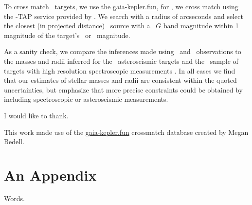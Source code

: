 \documentclass[modern]{aastex63}
\begin{document}
To cross match \kepler\ targets, we use the \href{https://gaia-kepler.fun}{gaia-kepler.fun}, for \tess, we cross match using the \gaia-TAP service provided by \astroquery.
We search with a radius of  arcseconds and select the closest (in projected distance) \gaia\ source with a \gaia\ $G$ band magnitude within 1 magnitude of the target's \tess\ or \kepler\ magnitude.

As a sanity check, we compare the inferences made using \isochrones\ and \gaia\ observations to the masses and radii inferred for the \kepler\ asteroseismic targets \citep{Chaplin:2014} and the \cks\ sample of targets with high resolution spectroscopic measurements \citep{Petigura:2017,Johnson:2017}.
In all cases we find that our estimates of stellar masses and radii are consistent within the quoted uncertainties, but emphasize that more precise constraints could be obtained by including spectroscopic or asteroseismic measurements.




\acknowledgments

I would like to thank.



This work made use of the \href{https://gaia-kepler.fun}{gaia-kepler.fun} crossmatch database created by Megan Bedell.

\vspace{5mm}


\appendix

\section{An Appendix}

Words.

{}

\end{document}

